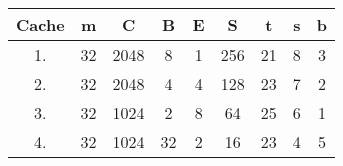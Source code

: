 \documentclass{article}
\begin{document}
\begin{tabular}{c c c c c c c c c}
	Cache & m & C & B & E & S & t & s & b \\
	\hline
	1. & 32 & 2048 & 8 & 1 & 256 & 21 & 8 & 3 \\
	2. & 32 & 2048 & 4 & 4 & 128 & 23 & 7 & 2 \\
	3. & 32 & 1024 & 2 & 8 & 64 & 25 & 6 & 1 \\
	4. & 32 & 1024 & 32 & 2 & 16 & 23 & 4 & 5 \\
\end{tabular}
\end{document}
